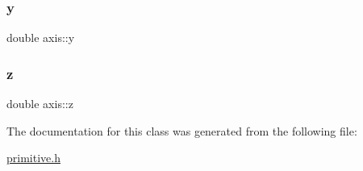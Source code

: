 \mbox{\label{classaxis_ad2d7e25ee425fee3ee7e818839897ab9}} 
\subsubsection{\texorpdfstring{y}{y}}
{\footnotesize\ttfamily double axis\+::y}

\mbox{\label{classaxis_aacda2920117dea5bca43044c368805d6}} 
\subsubsection{\texorpdfstring{z}{z}}
{\footnotesize\ttfamily double axis\+::z}



The documentation for this class was generated from the following file\+:\begin{DoxyCompactItemize}
\item 
\mbox{\hyperlink{primitive_8h}{primitive.\+h}}\end{DoxyCompactItemize}
